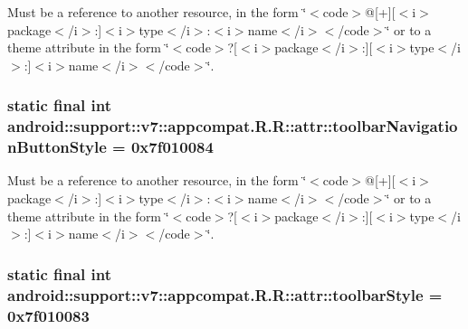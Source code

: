 Must be a reference to another resource, in the form \char`\"{}$<$code$>$@\mbox{[}+\mbox{]}\mbox{[}$<$i$>$package$<$/i$>$:\mbox{]}$<$i$>$type$<$/i$>$:$<$i$>$name$<$/i$>$$<$/code$>$\char`\"{} or to a theme attribute in the form \char`\"{}$<$code$>$?\mbox{[}$<$i$>$package$<$/i$>$:\mbox{]}\mbox{[}$<$i$>$type$<$/i$>$:\mbox{]}$<$i$>$name$<$/i$>$$<$/code$>$\char`\"{}. \hypertarget{classandroid_1_1support_1_1v7_1_1appcompat_1_1_r_1_1attr_0524798523ac1e8fde77cbb40f45e5b3}{
\subsubsection[{toolbarNavigationButtonStyle}]{\setlength{\rightskip}{0pt plus 5cm}static final int android::support::v7::appcompat.R.R::attr::toolbarNavigationButtonStyle = 0x7f010084}}
\label{classandroid_1_1support_1_1v7_1_1appcompat_1_1_r_1_1attr_0524798523ac1e8fde77cbb40f45e5b3}


Must be a reference to another resource, in the form \char`\"{}$<$code$>$@\mbox{[}+\mbox{]}\mbox{[}$<$i$>$package$<$/i$>$:\mbox{]}$<$i$>$type$<$/i$>$:$<$i$>$name$<$/i$>$$<$/code$>$\char`\"{} or to a theme attribute in the form \char`\"{}$<$code$>$?\mbox{[}$<$i$>$package$<$/i$>$:\mbox{]}\mbox{[}$<$i$>$type$<$/i$>$:\mbox{]}$<$i$>$name$<$/i$>$$<$/code$>$\char`\"{}. \hypertarget{classandroid_1_1support_1_1v7_1_1appcompat_1_1_r_1_1attr_9d90ea7a5d18174233971318773d0703}{
\subsubsection[{toolbarStyle}]{\setlength{\rightskip}{0pt plus 5cm}static final int android::support::v7::appcompat.R.R::attr::toolbarStyle = 0x7f010083}}
\label{classandroid_1_1support_1_1v7_1_1appcompat_1_1_r_1_1attr_9d90ea7a5d18174233971318773d0703}


